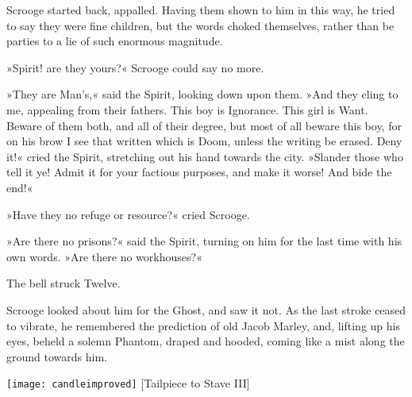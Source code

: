 Scrooge started back, appalled. Having them shown to him in this way, he tried to say they were fine children, but the words choked themselves, rather than be parties to a lie of such enormous magnitude.

»Spirit! are they yours?« Scrooge could say no more.

»They are Man's,« said the Spirit, looking down upon them. »And they cling to me, appealing from their fathers. This boy is Ignorance. This girl is Want. Beware of them both, and all of their degree, but most of all beware this boy, for on his brow I see that written which is Doom, unless the writing be erased. Deny it!« cried the Spirit, stretching out his hand towards the city. »Slander those who tell it ye! Admit it for your factious purposes, and make it worse! And bide the end!«

»Have they no refuge or resource?« cried Scrooge.

»Are there no prisons?« said the Spirit, turning on him for the last time with his own words. »Are there no workhouses?«

The bell struck Twelve.

Scrooge looked about him for the Ghost, and saw it not. As the last stroke ceased to vibrate, he remembered the prediction of old Jacob Marley, and, lifting up his eyes, beheld a solemn Phantom, draped and hooded, coming like a mist along the ground towards him.

\makeatletter
{}
{%
	\begin{center}
		\texttt{[image: candleimproved]}
		[Tailpiece to Stave III]{}
	\end{center}
	\enlargethispage{\baselineskip} 
}{%
}
\makeatother



\clearpage